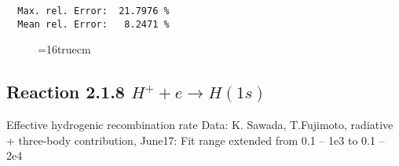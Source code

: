 \documentclass[12pt,dvipdfmx]{article}
\begin{document}
\begin{small}
\begin{verbatim}
  Max. rel. Error:  21.7976 %
  Mean rel. Error:   8.2471 %

\end{verbatim}\end{small}
\begin{figure} \label{2.1.8o}
\epsfxsize=16truecm
\end{figure}
\newpage

\subsection{
  Reaction 2.1.8 $ H^+ + e \rightarrow H(1s) $
}

   Effective hydrogenic recombination rate
   Data: K. Sawada, T.Fujimoto, radiative + three-body contribution, \cite{kn:Sawada}
   June17: Fit range extended from 0.1 -- 1e3 to 0.1 -- 2e4
\end{document}
